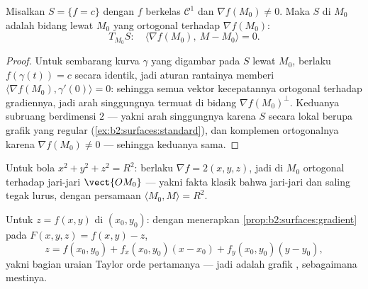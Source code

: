 \begin{proposition}\label{prop:b2:surfaces:gradient}
Misalkan $S = \{f = c\}$ dengan $f$ berkelas $\mathcal{C}^1$ dan $\nabla
f(M_0) \neq 0$. Maka  $S$ di $M_0$ adalah
bidang lewat $M_0$ yang ortogonal terhadap $\nabla f(M_0)$:
\[
T_{M_0}S :\quad
\langle \nabla f(M_0),\ M - M_0\rangle = 0 .
\]
\end{proposition}

\begin{proof}
Untuk sembarang kurva $\gamma$ yang digambar pada $S$ lewat $M_0$, berlaku $f(\gamma(t)) =
c$ secara identik, jadi aturan rantainya memberi $\langle
\nabla f(M_0), \gamma'(0)\rangle = 0$: sehingga semua vektor kecepatannya
ortogonal terhadap gradiennya, jadi arah singgungnya termuat
di bidang $\nabla f(M_0)^\perp$. Keduanya subruang
berdimensi $2$ --- yakni arah singgungnya karena $S$ secara lokal berupa
grafik yang regular (\cref{ex:b2:surfaces:standard}), dan komplemen
ortogonalnya karena $\nabla f(M_0) \neq 0$ --- sehingga keduanya
sama.
\end{proof}

\begin{example}\label{ex:b2:surfaces:spheretangent}
Untuk bola $x^2 + y^2 + z^2 = R^2$: berlaku $\nabla f = 2(x, y, z)$,
jadi  di $M_0$ ortogonal terhadap jari-jari
$\vect{OM_0}$ --- yakni fakta klasik bahwa jari-jari dan 
saling tegak lurus, dengan persamaan $\langle M_0, M\rangle = R^2$.
\end{example}

\begin{example}\label{ex:b2:surfaces:graphtangent}
Untuk $z = f(x, y)$ di $(x_0, y_0)$: dengan menerapkan
\cref{prop:b2:surfaces:gradient} pada $F(x,y,z) = f(x,y) - z$,
\[
z = f(x_0, y_0)
+ f_x(x_0, y_0)(x - x_0)
+ f_y(x_0, y_0)(y - y_0) ,
\]
yakni bagian  uraian Taylor orde pertamanya --- jadi
 adalah grafik , sebagaimana mestinya.
\end{example}

